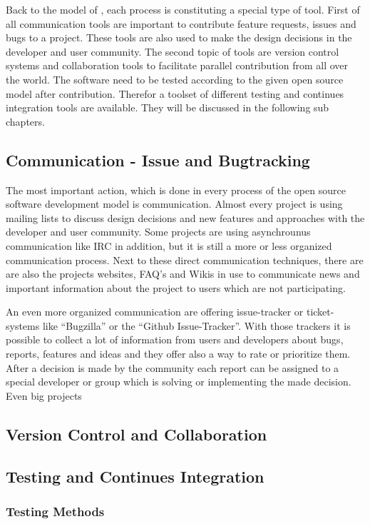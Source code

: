 \documentclass[DIV=calc,paper=a4,fontsize=11pt,twocolumn]{scrartcl}
\begin{document}
Back to the model of \citet{Haddad11}, each process is constituting a special type of tool. First of all communication tools are important to contribute feature requests, issues and bugs to a project. These tools are also used to make the design decisions in the developer and user community. The second topic of tools are version control systems and collaboration tools to facilitate parallel contribution from all over the world. The software need to be tested according to the given open source model after contribution. Therefor a toolset of different testing and continues integration tools are available. They will be discussed in the following sub chapters.

\subsection{Communication - Issue and Bugtracking}

The most important action, which is done in every process of the open source software development model is communication. Almost every project is using mailing lists to discuss design decisions and new features and approaches with the developer and user community. Some projects are using asynchrounus communication like IRC in addition, but it is still a more or less organized communication process. Next to these direct communication techniques, there are are also the projects websites, FAQ's and Wikis in use to communicate news and important information about the project to users which are not participating. \citep{ApacheFoundation13} 

An even more organized communication are offering issue-tracker or ticket-systems like \enquote{Bugzilla} or the \enquote{Github Issue-Tracker}. With those trackers it is possible to collect a lot of information from users and developers about bugs, reports, features and ideas and they offer also a way to rate or prioritize them. After a decision is made by the community each report can be assigned to a special developer or group which is solving or implementing the made decision. Even big projects  \citep{Robbins02adoptingoss}

\subsection{Version Control and Collaboration}



\subsection{Testing and Continues Integration}
\subsubsection{Testing Methods}





\end{document}
